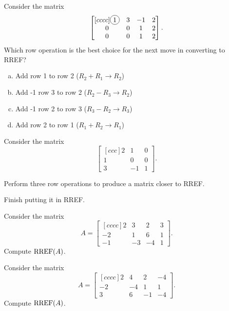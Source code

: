 \begin{activity}{5}
Consider the matrix
\[\begin{bmatrix}[cccc]\circledNumber{1} & 3 & -1 & 2  \\ 0 & 0 & 1 & 2 \\ 0 & 0 & 1 & 2 \end{bmatrix}.\]
Which row operation is the best choice for the next move in converting to RREF?
\begin{enumerate}[(a)]
\item Add row 1 to row 2 (\(R_2+R_1 \rightarrow R_2\))
\item Add -1 row 3 to  row 2 (\(R_2-R_3 \rightarrow R_2\))
\item Add -1 row 2 to  row 3 (\(R_3-R_2 \rightarrow R_3\))
\item Add row 2 to row 1 (\(R_1+R_2 \rightarrow R_1\))
\end{enumerate}
\end{activity}

\begin{activity}{10}
Consider the matrix
\[\begin{bmatrix}[ccc]2 & 1 & 0 \\ 1 & 0 & 0 \\ 3 & -1 & 1 \end{bmatrix}.\]
\vfill
\begin{subactivity}
Perform three row operations to produce a matrix closer to RREF.
\end{subactivity}
\begin{subactivity}
Finish putting it in RREF.
\end{subactivity}
\end{activity}

\begin{activity}{10}
Consider the matrix
\[A=\begin{bmatrix}[cccc]2 & 3 & 2 & 3 \\ -2 & 1 & 6 & 1 \\ -1 & -3 & -4 & 1 \end{bmatrix}.\]
\vfill
Compute \(\operatorname{RREF}(A)\).
\end{activity}

\begin{activity}{10}
Consider the matrix
\[A=\begin{bmatrix}[cccc] 2 & 4 & 2 & -4 \\ -2 & -4 & 1 & 1 \\ 3 & 6 & -1 & -4 \end{bmatrix}.\]
\vfill
Compute \(\operatorname{RREF}(A)\).
\end{activity}

